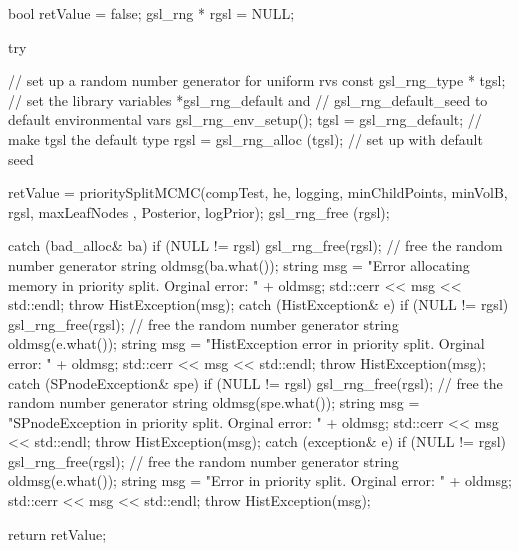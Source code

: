 \begin{DoxyCode}
{
    bool retValue = false;
    gsl_rng * rgsl = NULL;

    try {
        // set up a random number generator for uniform rvs
        const gsl_rng_type * tgsl;
        // set the library variables *gsl_rng_default and
        // gsl_rng_default_seed to default environmental vars
        gsl_rng_env_setup();
        tgsl = gsl_rng_default; // make tgsl the default type
        rgsl = gsl_rng_alloc (tgsl); // set up with default seed

        retValue = prioritySplitMCMC(compTest, he, logging,
                                    minChildPoints, minVolB, rgsl, maxLeafNodes
      ,
                                    Posterior, logPrior);
        gsl_rng_free (rgsl);
    }

    catch (bad_alloc& ba) {
        if (NULL != rgsl) gsl_rng_free(rgsl); // free the random number
       generator
        string oldmsg(ba.what());
        string msg = "Error allocating memory in priority split.  Orginal
       error: "
                                     + oldmsg;
        std::cerr << msg << std::endl;
        throw HistException(msg);
    }
    catch (HistException& e) {
        if (NULL != rgsl) gsl_rng_free(rgsl); // free the random number
       generator
        string oldmsg(e.what());
        string msg = "HistException error in priority split.  Orginal error: "
                                    + oldmsg;
        std::cerr << msg << std::endl;
        throw HistException(msg);
    }
    catch (SPnodeException& spe) {
        if (NULL != rgsl) gsl_rng_free(rgsl); // free the random number
       generator
        string oldmsg(spe.what());
        string msg = "SPnodeException in priority split.  Orginal error: "
                                    + oldmsg;
        std::cerr << msg << std::endl;
        throw HistException(msg);
    }
    catch (exception& e) {
        if (NULL != rgsl) gsl_rng_free(rgsl); // free the random number
       generator
        string oldmsg(e.what());
        string msg = "Error in priority split.  Orginal error: " + oldmsg;
        std::cerr << msg << std::endl;
        throw HistException(msg);
    }

    return retValue;
}
\end{DoxyCode}
